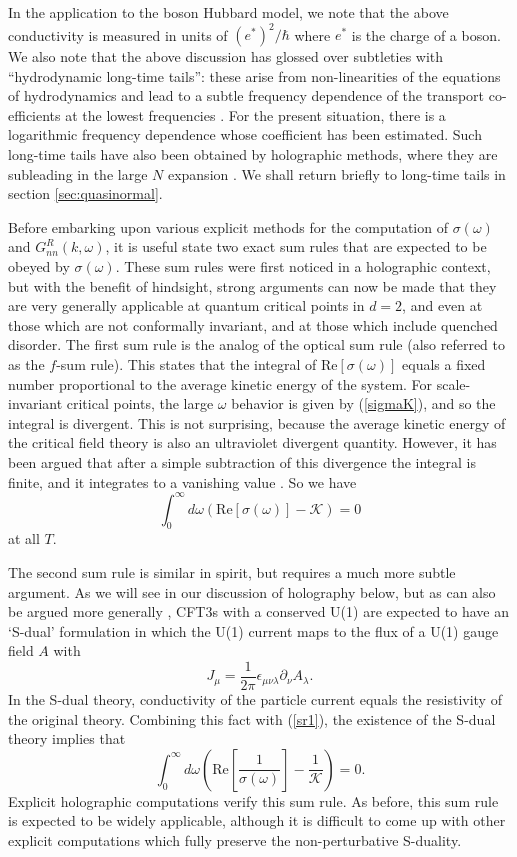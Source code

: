 \documentclass[10pt, oneside]{book}
\def\be{\begin{equation}}
\def\ee{\end{equation}}
\begin{document}
\begin{doublespace}
In the application to the boson Hubbard model, we note that the above conductivity is measured in units of $(e^\ast)^2/\hbar$
where $e^\ast$ is the charge of a boson. We also note that the above discussion has glossed over subtleties with 
``hydrodynamic long-time tails'': these arise from non-linearities of the equations of hydrodynamics and lead to a subtle frequency dependence
of the transport co-efficients at the lowest frequencies \cite{forster1995}. 
For the present situation, there is a logarithmic frequency dependence whose coefficient
has been estimated. Such long-time tails have also been obtained by holographic methods, where they are subleading in the large $N$ expansion \cite{caronhuot,krempa_nature}. We shall return briefly to long-time tails in section \ref{sec:quasinormal}.

Before embarking upon various explicit methods for the computation of $\sigma (\omega)$ and $G_{nn}^R (k, \omega)$, it is useful state
two exact sum rules that are expected to be obeyed by $\sigma (\omega)$. These sum rules were first noticed in a holographic context, but with
the benefit of hindsight, strong arguments can now be made that they are very generally applicable at quantum critical points in $d=2$,
and even at those which are not conformally invariant, and at those which include quenched disorder. 
The first sum rule is the analog of the optical sum rule (also referred to as the $f$-sum rule). This states that the integral of $\mathrm{Re}[ \sigma (\omega) ]$
equals a fixed number proportional to the average kinetic energy of the system. For scale-invariant critical points, the large $\omega$ behavior is
given by (\ref{sigmaK}), and so the integral is divergent. This is not surprising, because the average kinetic energy of the critical field theory is also
an ultraviolet divergent quantity. However, it has been argued that after a simple subtraction of this divergence the integral is finite, and it
integrates to a vanishing value \cite{ws12}. So we have
\be
\int_0^{\infty} d \omega \left( \mbox{Re}\left[\sigma (\omega) \right] - \mathcal{K} \right) = 0 \label{sr1}
\ee
at all $T$.

The second sum rule is similar in spirit, but requires a much more subtle argument. As we will see in our discussion of holography below, but as can also be argued more generally \cite{Witten:2003ya},
CFT3s with a conserved U(1) are expected to have an `S-dual' formulation in which the U(1) current maps to the flux of a U(1) gauge field $A$ with
\be 
J_\mu = \frac{1}{2 \pi} \epsilon_{\mu\nu\lambda} \partial_\nu A_\lambda .
\ee
In the S-dual theory, conductivity of the particle current equals the resistivity of the original theory. Combining this fact with (\ref{sr1}),
the existence of the S-dual theory implies that
\be
\int_0^{\infty} d \omega \left( \mbox{Re}\left[\frac{1}{\sigma (\omega)} \right] - \frac{1}{\mathcal{K}} \right) = 0. \label{sr2}
\ee
Explicit holographic computations verify this sum rule. As before, this sum rule is expected to be widely applicable, although it is 
difficult to come up with other explicit computations which fully preserve the non-perturbative S-duality.


\end{doublespace}
\end{document}
